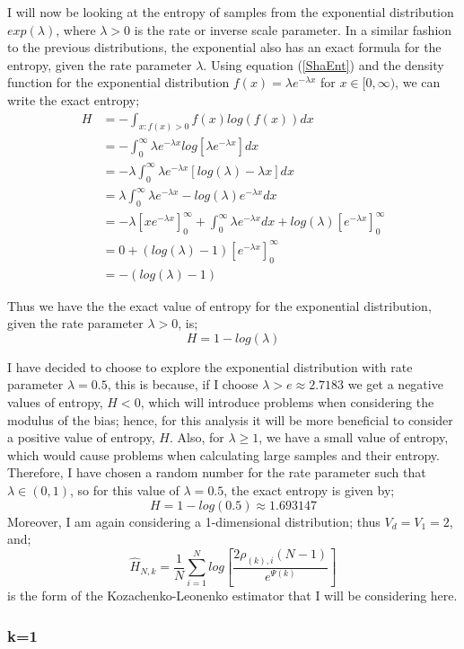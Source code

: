 \documentclass{article}
\begin{document}
I will now be looking at the entropy of samples from the exponential distribution $exp(\lambda)$, where $\lambda > 0$ is the rate or inverse scale parameter. In a similar fashion to the previous distributions, the exponential also has an exact formula for the entropy, given the rate parameter $\lambda$. Using equation (\ref{ShaEnt}) and the density function for the exponential distribution $f(x) = \lambda e^{-\lambda x}$ for $x \in [0, \infty)$, we can write the exact entropy;
\begin{align*}
H &= - \int_{x : f(x) > 0} f(x) log(f(x)) dx \\ 
&= - \int_{0}^{\infty} \lambda e^{-\lambda x} log [ \lambda e^{-\lambda x} ] dx  \\
&= - \lambda \int_{0}^{\infty} \lambda e^{-\lambda x} [log(\lambda) - \lambda x] dx  \\
&= \lambda \int_{0}^{\infty} \lambda e^{-\lambda x} - log(\lambda) e^{-\lambda x} dx \\
&= - \lambda \left[x e^{-\lambda x}\right]_{0}^{\infty} + \int_{0}^{\infty}\lambda e^{-\lambda x} dx + log(\lambda) \left[ e^{-\lambda x}\right]_{0}^{\infty} \\
&= 0 + (log(\lambda) - 1) \left[e^{-\lambda x} \right]_{0}^{\infty} \\
&= -(log(\lambda) - 1)
\end{align*}

Thus we have the the exact value of entropy for the exponential distribution, given the rate parameter $\lambda > 0$, is;
\begin{equation} \label{ExpEnt}
H = 1 - log(\lambda)
\end{equation}

I have decided to choose to explore the exponential distribution with rate parameter $\lambda = 0.5$, this is because, if I choose $\lambda > e \approx 2.7183$ we get a negative values of entropy, $H < 0$, which will introduce problems when considering the modulus of the bias; hence, for this analysis it will be more beneficial to consider a positive value of entropy, $H$. Also, for $\lambda \geq 1$, we have a small value of entropy, which would cause problems when calculating large samples and their entropy. Therefore, I have chosen a random number for the rate parameter such that $\lambda \in (0, 1)$, so for this value of $\lambda=0.5$, the exact entropy is given by;
\begin{equation} \label{exponential_exact}
H = 1 - log(0.5) \approx 1.693147
\end{equation}
Moreover, I am again considering a 1-dimensional distribution; thus $V_{d} = V_{1} = 2$, and;
\begin{equation}
\hat{H}_{N, k} =  \frac{1}{N} \sum_{i=1}^{N} log \left[ \frac{2\rho_{(k),i}(N-1)}{e^{\Psi(k)}} \right]\nonumber
\end{equation}
is the form of the Kozachenko-Leonenko estimator that I will be considering here.



\subsubsection{k=1} \label{E_k=1}
\end{document}
